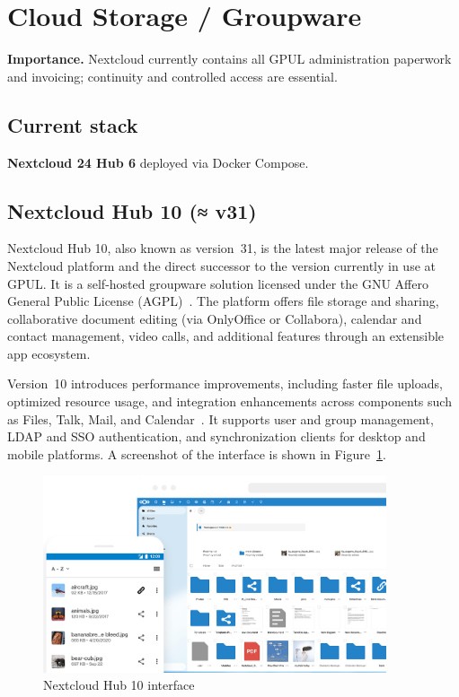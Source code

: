 \section{Cloud Storage / Groupware}

\textbf{Importance.}  Nextcloud currently contains all GPUL administration paperwork and invoicing; continuity and controlled access are essential.

\subsection{Current stack}
\textbf{Nextcloud 24 Hub 6} deployed via Docker Compose.

\subsection{Nextcloud Hub 10 (≈ v31)}

Nextcloud Hub 10, also known as version~31, is the latest major release of the Nextcloud platform and the direct successor to the version currently in use at GPUL. It is a self-hosted groupware solution licensed under the GNU Affero General Public License (AGPL)~\cite{nextcloud-docs}. The platform offers file storage and sharing, collaborative document editing (via OnlyOffice or Collabora), calendar and contact management, video calls, and additional features through an extensible app ecosystem.

Version~10 introduces performance improvements, including faster file uploads, optimized resource usage, and integration enhancements across components such as Files, Talk, Mail, and Calendar~\cite{nextcloud-blog}. It supports user and group management, LDAP and SSO authentication, and synchronization clients for desktop and mobile platforms. A screenshot of the interface is shown in Figure~\ref{fig:nextcloud-ui}.

\begin{figure}[H]
  \centering
  \includegraphics[width=0.9\textwidth]{imaxes/nextcloud-ui.png}
  \caption{Nextcloud Hub 10 interface}
  \label{fig:nextcloud-ui}
\end{figure}

